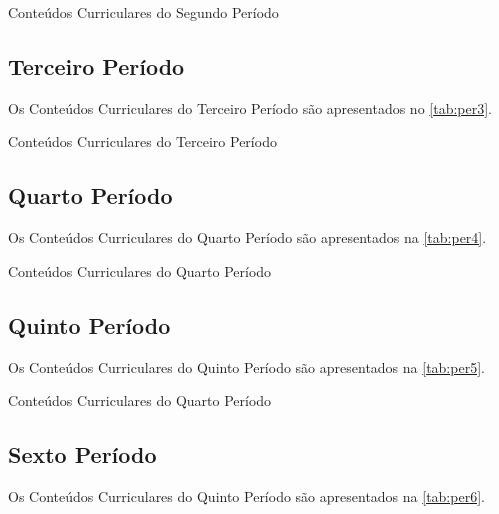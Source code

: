 \begin{table}[htb!]
	\centering\tiny
	\caption{Conteúdos Curriculares do Segundo Período}
	\label{tab:per2}
	
\end{table}

\subsection{Terceiro Período}

Os Conteúdos Curriculares do Terceiro Período são apresentados no \autoref{tab:per3}.

\begin{table}[htb!]
	\centering\tiny
	\caption{Conteúdos Curriculares do Terceiro Período}
	\label{tab:per3}
		
\end{table}

\subsection{Quarto Período}

Os Conteúdos Curriculares do Quarto Período são apresentados na \autoref{tab:per4}.

\begin{table}[htb!]
	\centering\tiny
	\caption{Conteúdos Curriculares do Quarto Período}
	\label{tab:per4}
		
\end{table}

\subsection{Quinto Período}
\label{sub:quinto}

Os Conteúdos Curriculares do Quinto Período são apresentados na \autoref{tab:per5}.

\begin{table}[htb!]
	\centering\tiny
	\caption{Conteúdos Curriculares do Quarto Período}
	\label{tab:per5}
	
	
\end{table}

\subsection{Sexto Período}
\label{sub:sexto}

Os Conteúdos Curriculares do Quinto Período são apresentados na \autoref{tab:per6}.

